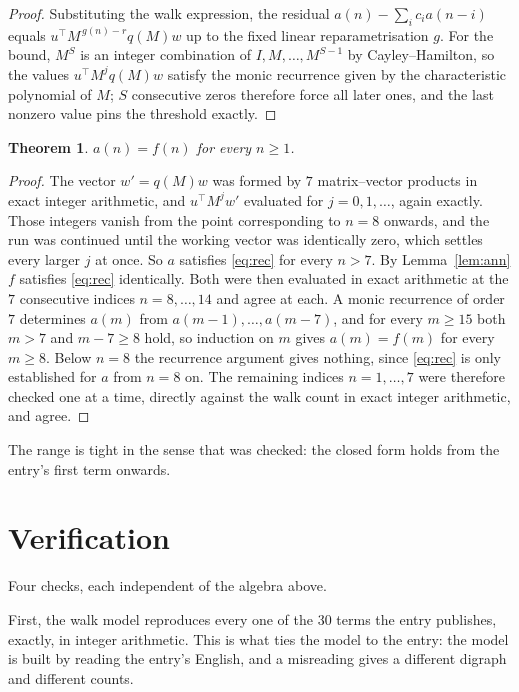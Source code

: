 \documentclass[11pt,a4paper]{article}
\theoremstyle{plain}
\newtheorem{theorem}{Theorem}
\theoremstyle{definition}
\begin{document}
\begin{proof}
Substituting the walk expression, the residual $a(n)-\sum_ic_ia(n-i)$ equals
$u^{\!\top}M^{\,g(n)-r}q(M)w$ up to the fixed linear reparametrisation $g$. For the bound,
$M^{S}$ is an integer combination of $I,M,\dots,M^{S-1}$ by Cayley--Hamilton, so the values
$u^{\!\top}M^{j}q(M)w$ satisfy the monic recurrence given by the characteristic polynomial of
$M$; $S$ consecutive zeros therefore force all later ones, and the last nonzero value pins the
threshold exactly.
\end{proof}

\begin{theorem}
$a(n)=f(n)$ for every $n\ge1$.
\end{theorem}

\begin{proof}
The vector $w'=q(M)w$ was formed by $7$ matrix--vector products in exact integer
arithmetic, and $u^{\!\top}M^{j}w'$ evaluated for $j=0,1,\dots$, again exactly. Those integers
vanish from the point corresponding to $n=8$ onwards, and the run was continued until the
working vector was identically zero, which settles every larger $j$ at once. So $a$ satisfies
\eqref{eq:rec} for every $n>7$. By Lemma~\ref{lem:ann} $f$ satisfies \eqref{eq:rec}
identically. Both were then evaluated in exact arithmetic at the $7$ consecutive indices
$n=8,\dots,14$ and agree at each. A monic recurrence of order $7$
determines $a(m)$ from $a(m-1),\dots,a(m-7)$, and for every $m\ge15$ both
$m>7$ and $m-7\ge8$ hold, so induction on $m$ gives $a(m)=f(m)$ for every
$m\ge8$.
Below $n=8$ the recurrence argument gives nothing, since \eqref{eq:rec} is only
established for $a$ from $n=8$ on. The remaining indices $n=1,\dots,7$ were
therefore checked one at a time, directly against the walk count in exact integer arithmetic,
and agree.
\end{proof}

The range is tight in the sense that was checked: the closed form holds from the entry's first term onwards.

\section{Verification}

Four checks, each independent of the algebra above.

First, the walk model reproduces every one of the $30$ terms the entry publishes,
exactly, in integer arithmetic. This is what ties the model to the entry: the model is built
by reading the entry's English, and a misreading gives a different digraph and different
counts.
\end{document}
